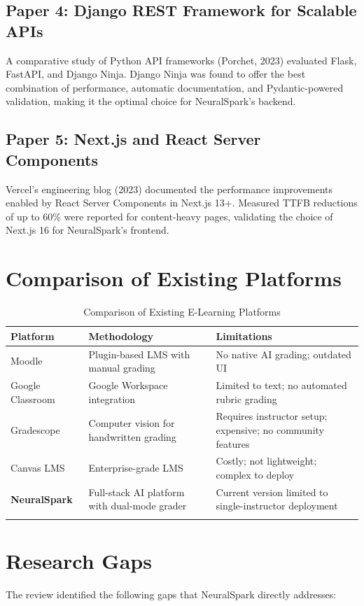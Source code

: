 \documentclass[12pt,a4paper]{report}
\begin{document}
\subsection{Paper 4: Django REST Framework for Scalable APIs}
A comparative study of Python API frameworks (Porchet, 2023) evaluated Flask, FastAPI, and
Django Ninja. Django Ninja was found to offer the best combination of performance, automatic
documentation, and Pydantic-powered validation, making it the optimal choice for NeuralSpark's
backend.

\subsection{Paper 5: Next.js and React Server Components}
Vercel's engineering blog (2023) documented the performance improvements enabled by React Server
Components in Next.js 13+. Measured TTFB reductions of up to 60\% were reported for content-heavy
pages, validating the choice of Next.js 16 for NeuralSpark's frontend.

\section{Comparison of Existing Platforms}

\begin{longtable}{@{}p{2.5cm}p{4.5cm}p{5.5cm}@{}}
\toprule
\textbf{Platform} & \textbf{Methodology} & \textbf{Limitations} \\
\midrule
\endhead
Moodle & Plugin-based LMS with manual grading & No native AI grading; outdated UI \\
\midrule
Google Classroom & Google Workspace integration & Limited to text; no automated rubric grading \\
\midrule
Gradescope & Computer vision for handwritten grading & Requires instructor setup; expensive; no community features \\
\midrule
Canvas LMS & Enterprise-grade LMS & Costly; not lightweight; complex to deploy \\
\midrule
\textbf{NeuralSpark} & Full-stack AI platform with dual-mode grader & Current version limited to single-instructor deployment \\
\bottomrule
\caption{Comparison of Existing E-Learning Platforms}
\label{tab:comparison}
\end{longtable}

\section{Research Gaps}
The review identified the following gaps that NeuralSpark directly addresses:
\end{document}
